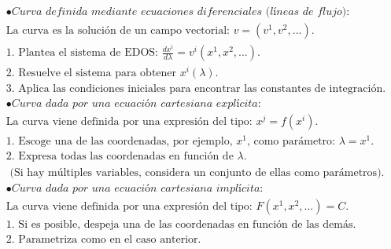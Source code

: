 \begin{align*}
   &\bullet \textit{Curva definida mediante ecuaciones diferenciales (líneas de flujo):}\\
   &\text{La curva es la solución de un campo vectorial: } v=(v^1, v^2, ...).\\
   &1. \text{ Plantea el sistema de EDOS: } \frac{dx^i}{d\lambda} = v^i (x^1,x^2, ...).\\
   &2. \text{ Resuelve el sistema para obtener } x^i (\lambda).\\
   &3. \text{ Aplica las condiciones iniciales para encontrar las constantes de integración.} \\[0.5mm]
   &\bullet \textit{Curva dada por una ecuación cartesiana explícita:}\\
   &\text{La curva viene definida por una expresión del tipo: } x^j = f(x^i).\\
   &1. \text{ Escoge una de las coordenadas, por ejemplo, $x^1$, como parámetro: } \lambda=x^1.\\
   &2. \text{ Expresa todas las coordenadas en función de }\lambda.\\
   &\text{    (Si hay múltiples variables, considera un conjunto de ellas como parámetros).}\\[0.5mm]
   &\bullet \textit{Curva dada por una ecuación cartesiana implícita:}\\
   &\text{La curva viene definida por una expresión del tipo: } F(x^1, x^2, ...) = C.\\
   &1. \text{ Si es posible, despeja una de las coordenadas en función de las demás. }\\
   &2. \text{ Parametriza como en el caso anterior.}\hspace{5pt}
\end{align*}
